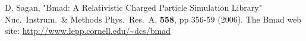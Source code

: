 \documentclass[11pt]{article}
\begin{document}
\begin{thebibliography}{9}

D. Sagan,
"Bmad: A Relativistic Charged Particle Simulation Library"
Nuc.\ Instrum.\ \& Methods Phys.\ Res.\ A, {\bf 558}, pp 356-59 (2006).
The Bmad web site:
\hfill\break
\hspace*{0.3in} \url{http://www.lepp.cornell.edu/~dcs/bmad}

\end{thebibliography}
\end{document}
